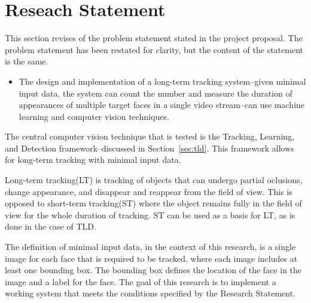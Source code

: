 \section{Reseach Statement}
  This section revises of the problem statement stated in the project proposal.
  The problem statement has been restated for clarity, but the content of the statement is the same.
  \begin{itemize}
    \item
      The design and implementation of a long-term tracking system--given minimal input data, the system can count the number and measure the duration of appearances of multiple target faces in a single video stream--can use machine learning and computer vision techniques.
  \end{itemize}

  The central computer vision technique that is tested is the Tracking, Learning, and Detection framework--discussed in Section~\ref{sec:tld}.
  This framework allows for long-term tracking with minimal input data. 
  
  Long-term tracking(LT) is tracking of objects that can undergo partial oclusions, change appearance, and disappear and reappear from the field of view.
  This is opposed to short-term tracking(ST) where the object remains fully in the field of view for the whole duration of tracking.
  ST can be used as a basis for LT, as is done in the case of TLD.

  The definition of minimal input data, in the context of this research, is a single image for each face that is required to be tracked, where each image includes at least one bounding box.
  The bounding box defines the location of the face in the image and a label for the face.
  The goal of this research is to implement a working system that meets the conditions specified by the Research Statement.
